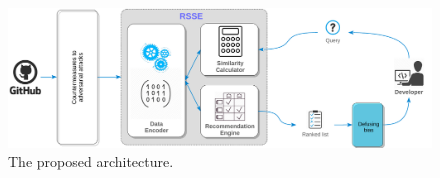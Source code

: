 





\begin{figure}[h!]
	\centering
	\includegraphics[width=0.60\columnwidth]{figs/SystemArchitecture.pdf}
	\vspace{-.2cm}
	\caption{The proposed architecture.}
	\vspace{-.4cm}
	\label{fig:SystemArchitecture}
\end{figure}


